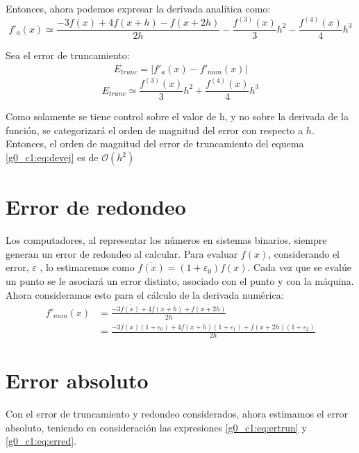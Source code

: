 \documentclass[../portafolio.tex]{subfiles}
\begin{document}
Entonces, ahora podemos expresar la derivada analítica como:
\begin{equation}
f'_{a}(x)\simeq \frac{-3f(x)+4f(x+h)-f(x+2h)}{2h}-\frac{f^{(3)}(x)}{3}h^2-\frac{f^{(4)}(x)}{4}h^3\label{g0_c1:eq:ertrun}
\end{equation}

Sea el error de truncamiento:
\begin{align*}
E_{trunc}=\left|f'_a(x)-f'_{num}(x)\right|
\end{align*}
\begin{equation}
E_{trunc}\simeq \frac{f^{(3)}(x)}{3}h^2+\frac{f^{(4)}(x)}{4}h^3 
\end{equation}

Como solamente se tiene control sobre el valor de h, y no sobre la derivada de la función, se categorizará el orden de magnitud del error con respecto a $h$. \\ 

Entonces, el orden de magnitud del error de truncamiento del equema \eqref{g0_c1:eq:devej} es de 
$ \mathcal{O}(h^2)$



\section{Error de redondeo}
Los computadores, al representar los números en sistemas binarios, siempre generan un error de redondeo al calcular. Para evaluar $f(x)$, considerando el error, $\varepsilon$ , lo estimaremos como $\overline{f(x)}=(1+\varepsilon_0) f(x)$. Cada vez que se evalúe un punto se le asociará un error distinto, asociado con el punto y con la máquina.\\

Ahora consideramos esto para el cálculo de la derivada numérica:
\begin{align}
f'_{num}(x)&=\frac{-3\overline{f(x)}+4\overline{f(x+h)}+\overline{f(x+2h)}}{2h}\\
&=\frac{-3f(x)(1+\varepsilon_0)+4f(x+h)(1+\varepsilon_1)+f(x+2h)(1+\varepsilon_2)}{2h}\label{g0_c1:eq:erred}
\end{align}

\section{Error absoluto}
Con el error de truncamiento y redondeo considerados, ahora estimamos el error absoluto, teniendo en consideración las expresiones \eqref{g0_c1:eq:ertrun} y \eqref{g0_c1:eq:erred}.
\end{document}
